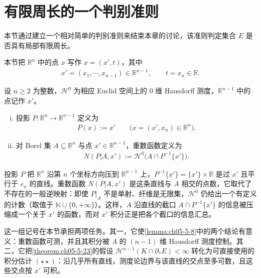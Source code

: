 \documentclass[../../main.tex]{subfiles}%
\begin{document}
\section{有限周长的一个判别准则}\label{section:ch05-11}

本节通过建立一个相对简单的判别准则来结束本章的讨论，该准则判定集合 $E$ 是否具有局部有限周长。

\begin{remark}\label{remark:ch05-sec-5-11-记号}
本节把 $\mathbb{R}^n$ 中的点 $x$ 写作 $x=(x',t)$，其中
\begin{align*}
x'=(x_1,\cdots,x_{n-1})\in\mathbb{R}^{n-1},\qquad t=x_n\in\mathbb{R}.
\end{align*}
\end{remark}

\begin{definition}\label{definition:ch05-5-12}
设 $n\geqslant2$ 为整数，$\mathcal{H}^0$ 为相应 Euclid 空间上的 $0$ 维 Hausdorff 测度，$\mathbb{R}^{n-1}$ 中的点记作 $x'$。
\begin{enumerate}[(i)]
\item 投影 $P:\mathbb{R}^n\to\mathbb{R}^{n-1}$ 定义为
\begin{align*}
P(x):=x'\qquad\bigl(x=(x',x_n)\in\mathbb{R}^n\bigr).
\end{align*}
\item 对 Borel 集 $A\subseteq\mathbb{R}^n$ 与点 $x'\in\mathbb{R}^{n-1}$，重数函数定义为
\begin{align*}
N(P|A,x'):=\mathcal{H}^0\bigl(A\cap P^{-1}\{x'\}\bigr).
\end{align*}
\end{enumerate}
\end{definition}

\begin{remark}\label{remark:ch05-def-5-12-动机}
投影 $P$ 把 $\mathbb{R}^n$ 沿第 $n$ 个坐标方向压到 $\mathbb{R}^{n-1}$ 上，$P^{-1}\{x'\}=\{x'\}\times\mathbb{R}$ 是过 $x'$ 且平行于 $e_n$ 的直线。重数函数 $N(P|A,x')$ 是这条直线与 $A$ 相交的点数，它取代了不存在的一般逆映射：即使 $P|_A$ 不是单射、纤维是无限集，$\mathcal{H}^0$ 仍给出一个有定义的计数（取值于 $\mathbb{N}\cup\{0,+\infty\}$）。这样，$A$ 沿直线的截口 $A\cap P^{-1}\{x'\}$ 的信息被压缩成一个关于 $x'$ 的函数，而对 $x'$ 积分正是把各个截口的信息汇总。

这一组记号在本节承担两项任务。其一，它使\cref{lemma:ch05-5-8}中的两个结论有意义：重数函数可测，并且其积分被 $A$ 的 $(n-1)$ 维 Hausdorff 测度控制。其二，它把\cref{theorem:ch05-5-23}的假设 $\mathcal{H}^{n-1}(K\cap\partial_*E)<\infty$ 转化为可直接使用的积分估计 $(\star\star)$：沿几乎所有直线，测度论边界与该直线的交点至多可数，且这些交点按 $x'$ 可积。%
\end{remark}
\end{document}
